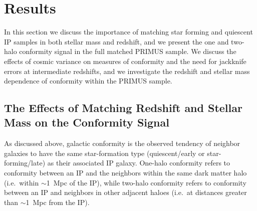 
\section{Results}\label{sec:results}

In this section we discuss the importance of matching star forming and quiescent IP 
samples in both stellar mass and redshift, and we present the one and two-halo 
conformity signal in the full matched PRIMUS sample.  We discuss the effects of 
cosmic variance on measures of conformity and the need for jackknife
errors at intermediate redshifts, and we investigate the redshift and stellar mass 
dependence of conformity within the PRIMUS sample.

\subsection{The Effects of Matching Redshift and Stellar Mass on the Conformity Signal}\label{sec:LTfraction}

As discussed above, galactic conformity is the observed tendency of neighbor 
galaxies to have the same star-formation type (quiescent/early or star-forming/late) 
as their associated IP galaxy.
One-halo conformity refers to conformity between an IP and the neighbors within the 
same dark matter halo (i.e.~within $\sim$1~Mpc of the IP),
while two-halo conformity refers to conformity between an IP and neighbors in other 
adjacent haloes (i.e.~at distances greater than $\sim$1~Mpc from the IP).

